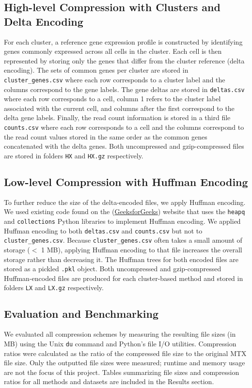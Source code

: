 \documentclass[unnumsec,webpdf,contemporary,large]{oup-authoring-template}
\begin{document}
\subsection{High-level Compression with Clusters and Delta Encoding}
For each cluster, a reference gene expression profile is constructed by identifying genes commonly expressed across all cells in the cluster. Each cell is then represented by storing only the genes that differ from the cluster reference (delta encoding). The sets of common genes per cluster are stored in \texttt{cluster\_genes.csv} where each row corresponds to a cluster label and the columns correspond to the gene labels. The gene deltas are stored in \texttt{deltas.csv} where each row corresponds to a cell, column 1 refers to the cluster label associated with the current cell, and columns after the first correspond to the delta gene labels. Finally, the read count information is stored in a third file \texttt{counts.csv} where each row corresponds to a cell and the columns correspond to the read count values stored in the same order as the common genes concatenated with the delta genes. Both uncompressed and gzip-compressed files are stored in folders \texttt{HX} and \texttt{HX.gz} respectively.

\subsection{Low-level Compression with Huffman Encoding}
To further reduce the size of the delta-encoded files, we apply Huffman encoding. We used existing code found on the (\href{https://www.geeksforgeeks.org/huffman-coding-in-python/}{GeeksforGeeks}) website that uses the \texttt{heapq} and \texttt{collections} Python libraries to implement Huffman encoding. We applied Huffman encoding to both \texttt{deltas.csv} and \texttt{counts.csv} but not to \texttt{cluster\_genes.csv}. Because \texttt{cluster\_genes.csv} often takes a small amount of storage ($<$ 1 MB), applying Huffman encoding to that file increases the overall storage rather than decreasing it. The Huffman trees for both encoded files are stored as a pickled \texttt{.pkl} object. Both uncompressed and gzip-compressed Huffman-encoded files are produced for each cluster-based method and stored in folders \texttt{LX} and \texttt{LX.gz} respectively.

\subsection{Evaluation and Benchmarking}
We evaluated all compression schemes by measuring the resulting file sizes (in MB) using the Unix \texttt{du} command and Python's file I/O utilities. Compression ratios were calculated as the ratio of the compressed file size to the original MTX file size. Only the outputted file sizes were measured; runtime and memory usage are not the focus of this project. Tables summarizing file sizes and compression ratios for all methods and datasets are included in the Results section.
\end{document}

